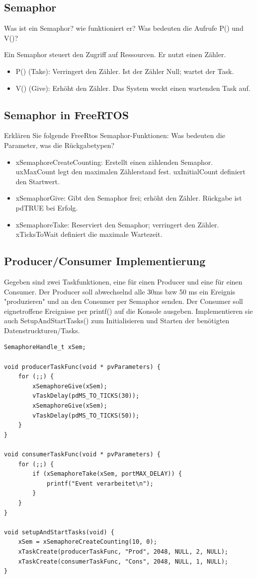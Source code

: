 \documentclass[12pt,a4paper]{article}
\begin{document}
\subsection{Semaphor}
Was ist ein Semaphor? wie funktioniert er? Was bedeuten die Aufrufe P() und V()?

Ein Semaphor steuert den Zugriff auf Ressourcen. Er nutzt einen Zähler.
\begin{itemize}
    \item P() (Take): Verringert den Zähler. Ist der Zähler Null; wartet der Task.
    \item V() (Give): Erhöht den Zähler. Das System weckt einen wartenden Task auf.
\end{itemize}

\subsection{Semaphor in FreeRTOS}
Erklären Sie folgende FreeRtos Semaphor-Funktionen: Was bedeuten die Parameter, was die Rückgabetypen?
\begin{itemize}
    \item xSemaphoreCreateCounting: Erstellt einen zählenden Semaphor. uxMaxCount legt den maximalen Zählerstand fest. uxInitialCount definiert den Startwert.
    \item xSemaphorGive: Gibt den Semaphor frei; erhöht den Zähler. Rückgabe ist pdTRUE bei Erfolg.
    \item xSemaphoreTake: Reserviert den Semaphor; verringert den Zähler. xTicksToWait definiert die maximale Wartezeit.
\end{itemize}
\newpage
\subsection{Producer/Consumer Implementierung}
Gegeben sind zwei Taskfunktionen, eine für einen Producer und eine für einen Consumer. Der Producer soll abwechselnd alle 30ms bzw 50 ms ein Ereignis 
"produzieren" und an den Consumer per Semaphor senden. Der Consumer soll eignetroffene Ereignisse per printf() auf die Konsole ausgeben.
Implementieren sie auch SetupAndStartTasks() zum Initialisieren und Starten der benötigten Datenstruckturen/Tasks.
\begin{lstlisting}
SemaphoreHandle_t xSem;

void producerTaskFunc(void * pvParameters) {
    for (;;) {
        xSemaphoreGive(xSem);
        vTaskDelay(pdMS_TO_TICKS(30));
        xSemaphoreGive(xSem);
        vTaskDelay(pdMS_TO_TICKS(50));
    }
}

void consumerTaskFunc(void * pvParameters) {
    for (;;) {
        if (xSemaphoreTake(xSem, portMAX_DELAY)) {
            printf("Event verarbeitet\n");
        }
    }
}

void setupAndStartTasks(void) {
    xSem = xSemaphoreCreateCounting(10, 0);
    xTaskCreate(producerTaskFunc, "Prod", 2048, NULL, 2, NULL);
    xTaskCreate(consumerTaskFunc, "Cons", 2048, NULL, 1, NULL);
}
\end{lstlisting}
\newpage
\end{document}
